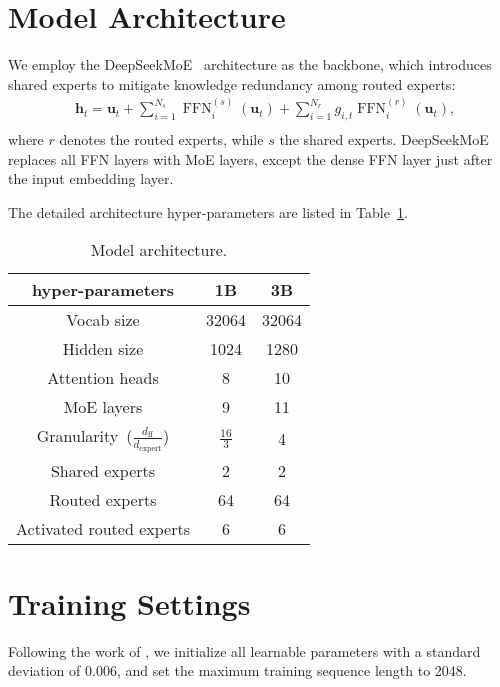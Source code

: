 \documentclass{article} %
\begin{document}
\section{Model Architecture}
\label{app:model_achitecture}
We employ the DeepSeekMoE~\citep{Dai2024DeepSeekMoETU} architecture as the backbone, which introduces shared experts to mitigate knowledge redundancy among routed experts:
\begin{equation}
    \begin{aligned}
& \mathbf{h}_t=\mathbf{u}_t+\sum_{i=1}^{N_s} \operatorname{FFN}_i^{(s)}\left(\mathbf{u}_t\right)+\sum_{i=1}^{N_r} g_{i, t} \operatorname{FFN}_i^{(r)}\left(\mathbf{u}_t\right), \\
\end{aligned}
\end{equation}
where $r$ denotes the routed experts, while $s$ the shared experts. DeepSeekMoE replaces all FFN layers with MoE layers, except the dense FFN layer just after the input embedding layer.

The detailed architecture hyper-parameters are listed in Table~\ref{tab:1B3B_architecture}.

\begin{table}[t]
\caption{Model architecture.}
\label{tab:1B3B_architecture}
\begin{center}
\begin{tabular}{c|cc}
\toprule
\textbf{hyper-parameters} & \textbf{1B} & \textbf{3B} \\
\midrule
Vocab size & 32064 & 32064\\
Hidden size & 1024 & 1280\\
Attention heads & 8 & 10\\
MoE layers & 9 & 11\\
Granularity~($\frac{d_\text{ff}}{d_\text{expert}}$) & $\frac{\text{16}}{\text{3}}$ & 4\\
Shared experts & 2 & 2\\
Routed experts & 64 & 64\\
Activated routed experts & 6 & 6\\
\bottomrule
\end{tabular}
\end{center}
\end{table}

\section{Training Settings}
\label{app:training_settingd}
Following the work of \cite{Dai2024DeepSeekMoETU}, we initialize all learnable parameters with a standard deviation of 0.006, and set the maximum training sequence length to 2048.
\end{document}
